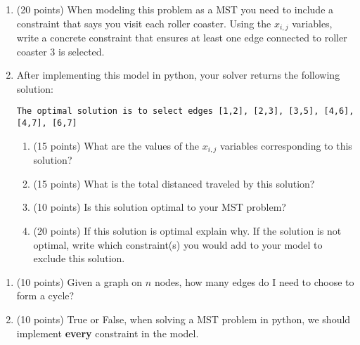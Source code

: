 \documentclass[letterpaper,oneside,12pt]{article}%
\begin{document}
\begin{enumerate}
\item (20 points) When modeling this problem as a MST you need to include a constraint that says you visit each roller coaster. Using the $x_{i,j}$ variables, write a concrete constraint that ensures at least one edge connected to roller coaster 3 is selected. \vspace{1.5in}

\item After implementing this model in python, your solver returns the following solution:

	\verb|The optimal solution is to select edges [1,2], [2,3], [3,5], [4,6], [4,7], [6,7]|
		\begin{enumerate}
		\item (15 points) What are the values of the $x_{i,j}$ variables corresponding to this solution? \vfill
		\item (15 points) What is the total distanced traveled by this solution? \vfill \newpage
		\item (10 points) Is this solution optimal to your MST problem? \vspace{1in}
		\item (20 points) If this solution is optimal explain why. If the solution is not optimal, write which constraint(s) you would add to your model to exclude this solution. \vspace{2in}
		\end{enumerate}
\end{enumerate}

\begin{enumerate}[resume]
\item (10 points) Given a graph on $n$ nodes, how many edges do I need to choose to form a cycle? \vspace{1in}
\item (10 points) True or False, when solving a MST problem in python, we should implement \textbf{every} constraint in the model. \vspace{1in}
\end{enumerate}
\end{document}

